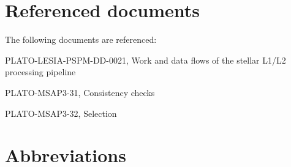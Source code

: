 \documentclass[a4paper, oneside, 11pt, article, english]{memoir}
\begin{document}
\section{Referenced documents}
\label{sec:docs}

The following documents are referenced:

\begin{description}
  \firmlist
\item[RD1] PLATO-LESIA-PSPM-DD-0021, Work and data flows of the stellar L1/L2 processing pipeline
\item[MSAP3-31] PLATO-MSAP3-31, Consistency checks
\item[MSAP3-32] PLATO-MSAP3-32, Selection
\end{description}



\section{Abbreviations}
\label{sec:abbrev}


\begin{description}
  \firmlist
\end{description}
\end{document}
